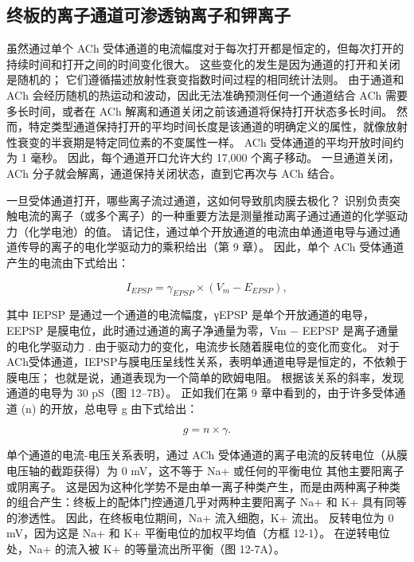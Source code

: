 \subsection{终板的离子通道可渗透钠离子和钾离子}
虽然通过单个 ACh 受体通道的电流幅度对于每次打开都是恒定的，但每次打开的持续时间和打开之间的时间变化很大。 这些变化的发生是因为通道的打开和关闭是随机的； 它们遵循描述放射性衰变指数时间过程的相同统计法则。 由于通道和 ACh 会经历随机的热运动和波动，因此无法准确预测任何一个通道结合 ACh 需要多长时间，或者在 ACh 解离和通道关闭之前该通道将保持打开状态多长时间。 然而，特定类型通道保持打开的平均时间长度是该通道的明确定义的属性，就像放射性衰变的半衰期是特定同位素的不变属性一样。 ACh 受体通道的平均开放时间约为 1 毫秒。 因此，每个通道开口允许大约 17,000 个离子移动。 一旦通道关闭，ACh 分子就会解离，通道保持关闭状态，直到它再次与 ACh 结合。

一旦受体通道打开，哪些离子流过通道，这如何导致肌肉膜去极化？ 识别负责突触电流的离子（或多个离子）的一种重要方法是测量推动离子通过通道的化学驱动力（化学电池）的值。 请记住，通过单个开放通道的电流由单通道电导与通过通道传导的离子的电化学驱动力的乘积给出（第 9 章）。 因此，单个 ACh 受体通道产生的电流由下式给出：

\begin{equation}
	I_{EPSP} = \gamma_{EPSP}\times (V_m - E_{EPSP}),
\end{equation}

其中 IEPSP 是通过一个通道的电流幅度，γEPSP 是单个开放通道的电导，EEPSP 是膜电位，此时通过通道的离子净通量为零，Vm − EEPSP 是离子通量的电化学驱动力 . 由于驱动力的变化，电流步长随着膜电位的变化而变化。 对于ACh受体通道，IEPSP与膜电压呈线性关系，表明单通道电导是恒定的，不依赖于膜电压； 也就是说，通道表现为一个简单的欧姆电阻。 根据该关系的斜率，发现通道的电导为 30 pS（图 12–7B）。 正如我们在第 9 章中看到的，由于许多受体通道 (n) 的开放，总电导 g 由下式给出：

\begin{equation}
	g = n \times \gamma.
\end{equation}

单个通道的电流-电压关系表明，通过 ACh 受体通道的离子电流的反转电位（从膜电压轴的截距获得）为 0 mV，这不等于 Na+ 或任何的平衡电位 其他主要阳离子或阴离子。 这是因为这种化学势不是由单一离子种类产生，而是由两种离子种类的组合产生：终板上的配体门控通道几乎对两种主要阳离子 Na+ 和 K+ 具有同等的渗透性。 因此，在终板电位期间，Na+ 流入细胞，K+ 流出。 反转电位为 0 mV，因为这是 Na+ 和 K+ 平衡电位的加权平均值（方框 12-1）。 在逆转电位处，Na+ 的流入被 K+ 的等量流出所平衡（图 12-7A）。

